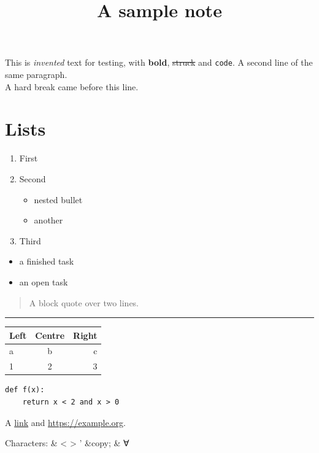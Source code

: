 \documentclass{amsart}
\theoremstyle{definition}
\theoremstyle{remark}
\begin{document}
\title{A sample note}
\maketitle

This is \emph{invented} text for testing, with \textbf{bold}, \sout{struck} and \texttt{code}.
A second line of the same paragraph.\\
A hard break came before this line.

\section{Lists}\label{tn-h-lists}

\begin{enumerate}
\item First
\item Second\begin{itemize}
\item nested bullet
\item another
\end{itemize}


\item Third
\end{enumerate}

\begin{itemize}
\item[$\boxtimes$] a finished task
\item[$\square$] an open task
\end{itemize}

\begin{quote}
A block quote
over two lines.

\end{quote}

\par\noindent\rule{\linewidth}{0.4pt}\par

\begin{center}
\begin{tabular}{lcr}
\hline
Left & Centre & Right \\
\hline
a & b & c \\
1 & 2 & 3 \\
\hline
\end{tabular}
\end{center}

\begin{verbatim}
def f(x):
    return x < 2 and x > 0
\end{verbatim}

A \href{https://example.org/page?a=1\&b=2}{link} and \href{https://example.org}{https://example.org}.

Characters: \& \textless{} \textgreater{} \textquotedbl{} ' \&copy; \& ∀
\end{document}
